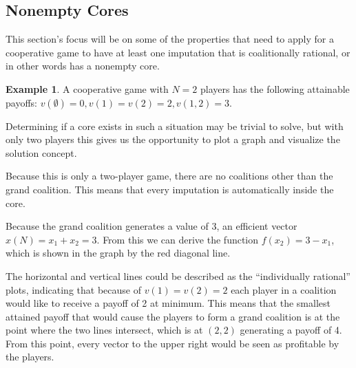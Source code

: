 \documentclass[10pt,a4paper,titlepage]{article}
\theoremstyle{plain}
\theoremstyle{definition}
\newtheorem{example}[thm]{Example} %
\begin{document}
\subsection{Nonempty Cores}
This section's focus will be on some of the properties that need to apply for a cooperative game to have at least one imputation that is coalitionally rational, or in other words has a nonempty core.

\begin{example}
    A cooperative game with $N = 2$ players has the following attainable payoffs: $v(\emptyset) = 0, v(1) = v(2) = 2, v(1, 2) = 3$.

    Determining if a core exists in such a situation may be trivial to solve, but with only two players this gives us the opportunity to plot a graph and visualize the solution concept.
    
    Because this is only a two-player game, there are no coalitions other than the grand coalition. This means that every imputation is automatically inside the core.
    
\end{example}

Because the grand coalition generates a value of 3, an efficient vector $x(N) = x_1 + x_2 = 3$. From this we can derive the function $f(x_2) = 3 - x_1$, which is shown in the graph by the red diagonal line.

The horizontal and vertical lines could be described as the \enquote{individually rational} plots, indicating that because of $v(1) = v(2) = 2$ each player in a coalition would like to receive a payoff of 2 at minimum. This means that the smallest attained payoff that would cause the players to form a grand coalition is at the point where the two lines intersect, which is at $(2, 2)$ generating a payoff of 4. From this point, every vector to the upper right would be seen as profitable by the players.
\end{document}
